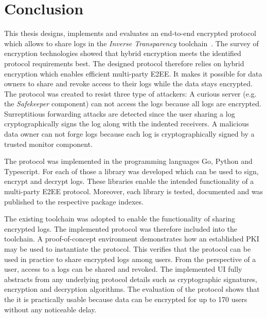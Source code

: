 \documentclass[../main.tex]{subfiles}
\begin{document}
\chapter{Conclusion}

This thesis designs, implements and evaluates an end-to-end encrypted protocol which allows to share logs in the \emph{Inverse Transparency} toolchain~\cite{Zieglmeier2021}.
The survey of encryption technologies showed that hybrid encryption meets the identified protocol requirements best.
The designed protocol therefore relies on hybrid encryption which enables efficient multi-party E2EE.
It makes it possible for data owners to share and revoke access to their logs while the data stays encrypted.
The protocol was created to resist three type of attackers: 
A curious server (e.g. the \emph{Safekeeper} component) can not access the logs because all logs are encrypted.
Surreptitious forwarding attacks are detected since the user sharing a log cryptographically signs the log along with the indented receivers.
A malicious data owner can not forge logs because each log is cryptographically signed by a trusted monitor component.

The protocol was implemented in the programming languages Go, Python and Typescript.
For each of those a library was developed which can be used to sign, encrypt and decrypt logs.
These libraries enable the intended functionality of a multi-party E2EE protocol.
Moreover, each library is tested, documented and was published to the respective package indexes.

The existing toolchain was adopted to enable the functionality of sharing encrypted logs.
The implemented protocol was therefore included into the toolchain.
A proof-of-concept environment demonstrates how an established PKI may be used to instantiate the protocol.
This verifies that the protocol can be used in practice to share encrypted logs among users.
From the perspective of a user, access to a logs can be shared and revoked.
The implemented UI fully abstracts from any underlying protocol details such as cryptographic signatures, encryption and decryption algorithms.
The evaluation of the protocol shows that the it is practically usable because data can be encrypted for up to 170 users without any noticeable delay.
\end{document}
